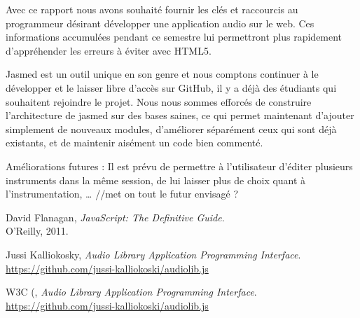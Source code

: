 \documentclass[pdftex,12pt,a4paper]{article}
\begin{document}
Avec ce rapport nous avons souhaité fournir les clés et raccourcis au programmeur désirant développer une application audio sur le web. Ces informations accumulées pendant ce semestre lui permettront plus rapidement d’appréhender les erreurs à éviter avec HTML5.

Jasmed est un outil unique en son genre et nous comptons continuer à le développer et le laisser libre d’accès sur GitHub, il y a déjà des étudiants qui souhaitent rejoindre le projet.
Nous nous sommes efforcés de construire l’architecture de jasmed sur des bases saines, ce qui permet maintenant d’ajouter simplement de nouveaux modules, d’améliorer séparément ceux qui sont déjà existants, et de maintenir aisément un code bien commenté.

Améliorations futures :
Il est prévu de permettre à l’utilisateur d’éditer plusieurs instruments dans la même session, de lui laisser plus de choix quant à l’instrumentation, … //met on tout le futur envisagé ?


\begin{thebibliography}{99}

  David Flanagan,
  \emph{JavaScript: The Definitive Guide}.
  \\O'Reilly,
  2011.

Jussi Kalliokosky,
\emph{Audio Library Application Programming Interface}.\\
\url{https://github.com/jussi-kalliokoski/audiolib.js}

W3C (,
\emph{Audio Library Application Programming Interface}.\\
\url{https://github.com/jussi-kalliokoski/audiolib.js}

\end{thebibliography}

\appendix
\end{document}
